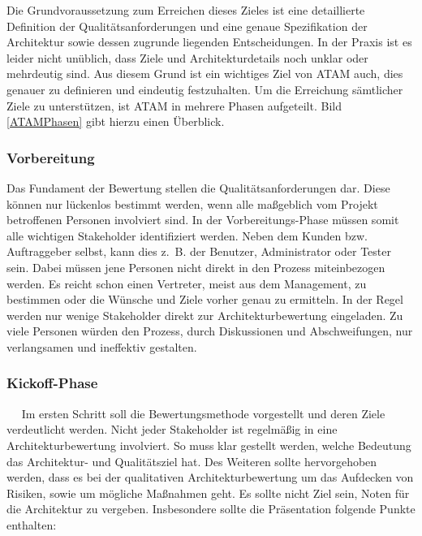 Die Grundvoraussetzung zum Erreichen dieses Zieles ist eine detaillierte Definition der Qualitätsanforderungen und eine genaue Spezifikation der Architektur sowie
dessen zugrunde liegenden Entscheidungen\cite{Clements2000}. In der Praxis ist es leider nicht unüblich, dass Ziele und Architekturdetails noch unklar oder mehrdeutig sind. Aus diesem Grund ist ein wichtiges Ziel von \ac{ATAM} auch, dies genauer zu definieren und eindeutig festzuhalten. Um die Erreichung sämtlicher Ziele zu unterstützen, ist \ac{ATAM} in 
mehrere Phasen aufgeteilt. Bild \ref{ATAMPhasen} gibt hierzu einen Überblick.


\subsubsection{Vorbereitung}
Das Fundament der Bewertung stellen die Qualitätsanforderungen dar. Diese können nur lückenlos bestimmt werden, wenn alle maßgeblich vom Projekt betroffenen Personen involviert sind. In der Vorbereitungs-Phase müssen somit alle wichtigen Stakeholder identifiziert werden. Neben dem Kunden bzw. Auftraggeber selbst, kann dies z.~B. der Benutzer, Administrator oder Tester sein. Dabei müssen jene Personen nicht direkt in den Prozess miteinbezogen werden. Es reicht schon einen Vertreter, meist aus dem Management, zu bestimmen oder die Wünsche und Ziele vorher genau zu ermitteln\cite{Starke2015}. In der Regel werden nur wenige Stakeholder direkt zur Architekturbewertung eingeladen. Zu viele Personen würden den Prozess, durch Diskussionen und Abschweifungen, nur verlangsamen und ineffektiv gestalten.
\subsubsection{Kickoff-Phase}\
\
Im ersten Schritt soll die Bewertungsmethode vorgestellt und deren Ziele verdeutlicht werden. Nicht jeder Stakeholder ist regelmäßig in eine Architekturbewertung involviert. So muss klar gestellt werden, welche Bedeutung das Architektur- und Qualitätsziel hat\cite{Starke2015}. Des Weiteren sollte hervorgehoben werden, dass es bei der qualitativen Architekturbewertung um das Aufdecken von Risiken, sowie um mögliche Maßnahmen geht. Es sollte nicht Ziel sein, Noten für die Architektur zu vergeben. Insbesondere sollte die Präsentation folgende Punkte enthalten\cite{Clements2000}:

